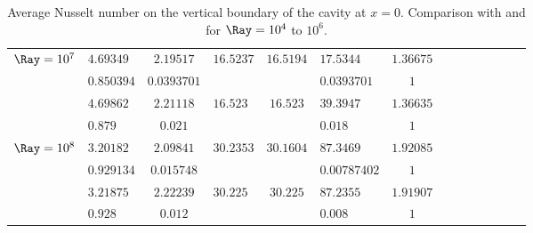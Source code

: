 \begin{table}
\begin{center}
\begin{tabular}{*{7}{cl}}
          \multirow{2}{*}{$\Ray = 10^7$} & $4.69349$ & $2.19517$ & \multirow{2}{*}{$16.5237$} & \multirow{2}{*}{$16.5194 $} & $17.5344$ & $1.36675$  \\
          & $0.850394$ & $0.0393701$ & & & $0.0393701$ & $1$ \\ 
          \multirow{2}{*}{\cite{LeQuere91}} & $4.69862$ & $2.21118 $ & \multirow{2}{*}{$16.523$} & \multirow{2}{*}{$16.523 $} & $39.3947$ & $1.36635$  \\
          & $0.879$ & $0.021$ & & & $0.018$ & $1$ \\ \hline

          \multirow{2}{*}{$\Ray = 10^8$} & $3.20182$ & $2.09841$ & \multirow{2}{*}{$30.2353$} & \multirow{2}{*}{$30.1604 $} & $87.3469$ & $1.92085$  \\
          & $0.929134$ & $0.015748$ & & & $0.00787402$ & $1$ \\ 
          \multirow{2}{*}{\cite{LeQuere91}} & $3.21875$ & $2.22239 $ & \multirow{2}{*}{$30.225$} & \multirow{2}{*}{$30.225 $} & $87.2355$ & $1.91907$  \\
          & $0.928$ & $0.012$ & & & $0.008$ & $1$ \\ \bottomrule
          
               \end{tabular}
   \end{center}
   \caption{Average Nusselt number on the vertical boundary of the cavity at $x=0$. Comparison with \cite{de1983natural} and \cite{LeQuere91} for $\Ray= 10^4$ to $10^6$.}
   \label{tab-Nu-natconv}
\end{table}



